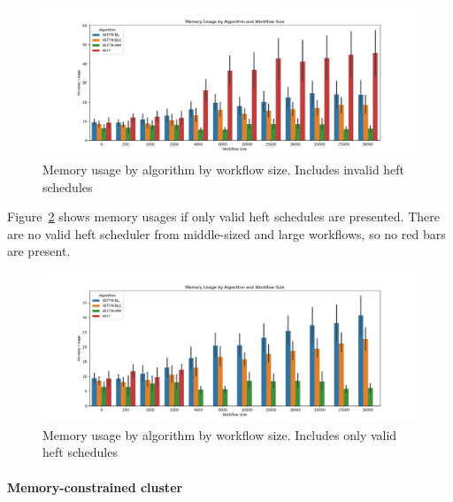 \documentclass[conference]{IEEEtran}
\begin{document}
    \begin{figure}[tb]
        \centering
        \includegraphics[width=1.1\columnwidth] {images/mem-usage-normal}
        \caption{Memory usage by algorithm by workflow size. Includes invalid heft schedules}
        \label{fig:mem-usages-normal}
        \vspace{-0.3cm}
    \end{figure}

    Figure~\ref{fig:mem-usages-onlyvalid} shows memory usages if only valid heft schedules are presented.
    There are no valid heft scheduler from middle-sized and large workflows, so no red bars are present.

    \begin{figure}[tb]
        \centering
        \includegraphics[width=1.1\columnwidth] {images/mem-usage-normal-onlyvalid}
        \caption{Memory usage by algorithm by workflow size. Includes only valid heft schedules}
        \label{fig:mem-usages-onlyvalid}
        \vspace{-0.3cm}
    \end{figure}



    \paragraph{Memory-constrained cluster}
\end{document}
